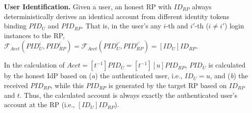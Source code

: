 
\vspace{0.8mm}
\noindent\textbf{User Identification.}
Given a user, an honest RP with $ID_{RP}$ always deterministically derives an identical account from different identity tokens binding $PID_U$ and $PID_{RP}$.
That is,
    in the user's any $i$-th and $i'$-th ($i \neq i'$) login instances to the RP,
 $\mathcal{F}_{Acct}(PID_{U}^i, PID_{RP}^i) = \mathcal{F}_{Acct}(PID_{U}^{i'}, PID_{RP}^{i'}) = [ID_U]ID_{RP}$.

In the calculation of $Acct = [t^{-1}]PID_U = [t^{-1}][u]PID_{RP}$,
$PID_U$ is calculated by the honest IdP based on (\emph{a}) the authenticated user, i.e., $ID_U = u$, and (\emph{b}) the received $PID_{RP}$, while this $PID_{RP}$ is generated by the target RP based on $ID_{RP}$ and $t$.
Thus, the calculated account is always exactly the authenticated user's account at the RP (i.e., $[ID_U]ID_{RP}$).




